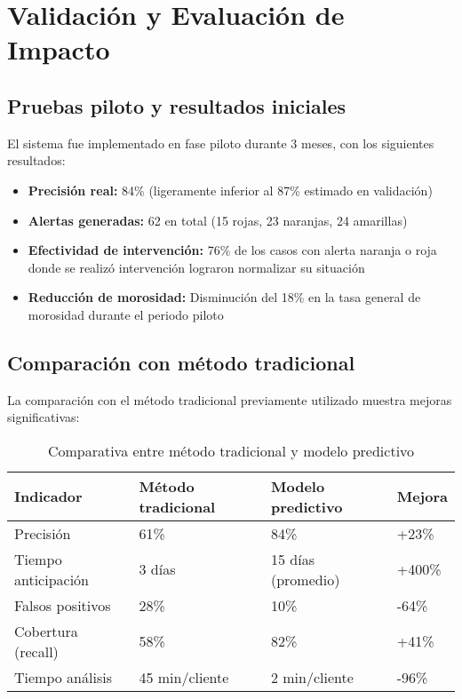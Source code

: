 \section{Validación y Evaluación de Impacto}
\subsection{Pruebas piloto y resultados iniciales}
El sistema fue implementado en fase piloto durante 3 meses, con los siguientes resultados:

\begin{itemize}
    \item \textbf{Precisión real:} 84\% (ligeramente inferior al 87\% estimado en validación)
    
    \item \textbf{Alertas generadas:} 62 en total (15 rojas, 23 naranjas, 24 amarillas)
    
    \item \textbf{Efectividad de intervención:} 76\% de los casos con alerta naranja o roja donde se realizó intervención lograron normalizar su situación
    
    \item \textbf{Reducción de morosidad:} Disminución del 18\% en la tasa general de morosidad durante el periodo piloto
\end{itemize}

\subsection{Comparación con método tradicional}
La comparación con el método tradicional previamente utilizado muestra mejoras significativas:

\begin{table}[ht]
\centering
\begin{tabular}{|p{4cm}|p{3cm}|p{3cm}|p{3cm}|}
\hline
\textbf{Indicador} & \textbf{Método tradicional} & \textbf{Modelo predictivo} & \textbf{Mejora} \\
\hline
Precisión & 61\% & 84\% & +23\% \\
\hline
Tiempo anticipación & 3 días & 15 días (promedio) & +400\% \\
\hline
Falsos positivos & 28\% & 10\% & -64\% \\
\hline
Cobertura (recall) & 58\% & 82\% & +41\% \\
\hline
Tiempo análisis & 45 min/cliente & 2 min/cliente & -96\% \\
\hline
\end{tabular}
\caption{Comparativa entre método tradicional y modelo predictivo}
\end{table}

